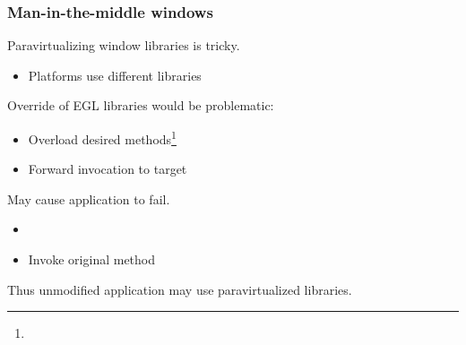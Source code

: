
\begin{frame}
\frametitle{Man-in-the-middle windows}

Paravirtualizing window libraries is tricky.
\begin{itemize}
	\item Platforms use different libraries
\end{itemize}

Override of EGL libraries would be problematic:
\begin{itemize}
	\item Overload desired methods\footnote{}
	\item Forward invocation to target
\end{itemize}

May cause application to fail.
\begin{itemize}
	\item {}
	\item Invoke original method
\end{itemize}

Thus unmodified application may use paravirtualized libraries.

\end{frame}